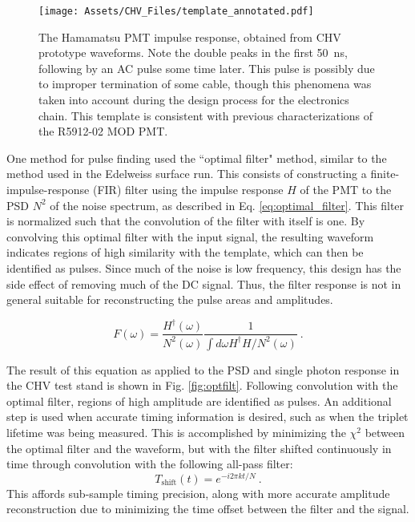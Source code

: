 \begin{figure}
    \centering
    \texttt{[image: Assets/CHV\_Files/template\_annotated.pdf]}
    \caption[The Hamamatsu PMT impulse response, obtained from CHV prototype waveforms. ]%
    {The Hamamatsu PMT impulse response, obtained from CHV prototype waveforms. 
    Note the double peaks in the first 50~ns, following by an AC pulse some time later. This pulse is possibly due to improper termination of some cable, though this phenomena was taken into account during the design process for the electronics chain.
    This template is consistent with previous characterizations of the R5912-02 MOD PMT\cite{caldwell_characterization_2013}.}
    \label{fig:template}
\end{figure}

One method for pulse finding used the ``optimal filter" method, similar to the method used in the Edelweiss surface run\cite{armengaud_searching_2019}.
This consists of constructing a finite-impulse-response (FIR) filter using the impulse response $H$ of the PMT to the PSD $N^2$ of the noise spectrum, as described in Eq. \ref{eq:optimal_filter}.
This filter is normalized such that the convolution of the filter with itself is one.
By convolving this optimal filter with the input signal, the resulting waveform indicates regions of high similarity with the template, which can then be identified as pulses.
Since much of the noise is low frequency, this design has the side effect of removing much of the DC signal. 
Thus, the filter response is not in general suitable for reconstructing the pulse areas and amplitudes.

\begin{equation}
    F(\omega) = \frac{H^\dagger(\omega)}{N^2(\omega)} \frac{1}{\int d \omega H^\dagger H / N^2(\omega) } ~.
    \label{eq:optimal_filter}
\end{equation}

The result of this equation as applied to the PSD and single photon response in the CHV test stand is shown in Fig. \ref{fig:optfilt}. 
Following convolution with the optimal filter, regions of high amplitude are identified as pulses.
An additional step is used when accurate timing information is desired, such as when the triplet lifetime was being measured.
This is accomplished by minimizing the $\chi^2$ between the optimal filter and the waveform, but with the filter shifted continuously in time through convolution with the following all-pass filter:
\begin{equation}
    T_{\text{shift}}(t) = e^{-i 2 \pi kt/N}~.
    \label{eq:timeshift}
\end{equation}
\noindent
This affords sub-sample timing precision, along with more accurate amplitude reconstruction due to minimizing the time offset between the filter and the signal.

